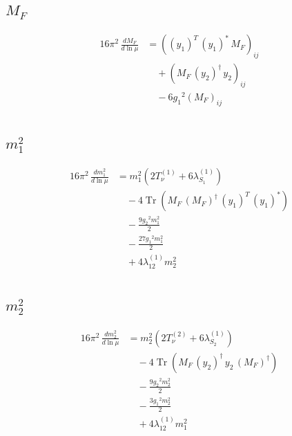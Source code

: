 \documentclass[10pt,a4paper]{article}
\begin{document}
\subsection*{$M_F$}
\begin{align*}
16\pi^2\,\frac{d M_F}{d\ln\mu} &=\left(\left({y_1}\right)^{T}\,\left({y_1}\right)^{*}\,{M_F}\right)_{ij} \\
&\quad +\left({M_F}\,\left({y_2}\right)^{\dagger}\,{y_2}\right)_{ij} \\
&\quad -6 {g_1}^2 \left({M_F}\right)_{ij} \\
\end{align*}
\subsection*{$m_1^2$}
\begin{align*}
16\pi^2\,\frac{d m_1^2}{d\ln\mu} &={m_1^2} (2 T_{\nu}^{(1)}+6 {\lambda_{S_1}^{(1)}}) \\
&\quad -4 \operatorname{Tr}\!\left({M_F}\,\left({M_F}\right)^{\dagger}\,\left({y_1}\right)^{T}\,\left({y_1}\right)^{*}\right) \\
&\quad -\frac{9 {g_2}^2 {m_1^2}}{2} \\
&\quad -\frac{27 {g_1}^2 {m_1^2}}{2} \\
&\quad +4 {\lambda_{12}^{(1)}} {m_2^2} \\
\end{align*}
\subsection*{$m_2^2$}
\begin{align*}
16\pi^2\,\frac{d m_2^2}{d\ln\mu} &={m_2^2} (2 T_{\nu}^{(2)}+6 {\lambda_{S_2}^{(1)}}) \\
&\quad -4 \operatorname{Tr}\!\left({M_F}\,\left({y_2}\right)^{\dagger}\,{y_2}\,\left({M_F}\right)^{\dagger}\right) \\
&\quad -\frac{9 {g_2}^2 {m_2^2}}{2} \\
&\quad -\frac{3 {g_1}^2 {m_2^2}}{2} \\
&\quad +4 {\lambda_{12}^{(1)}} {m_1^2} \\
\end{align*}
\end{document}
